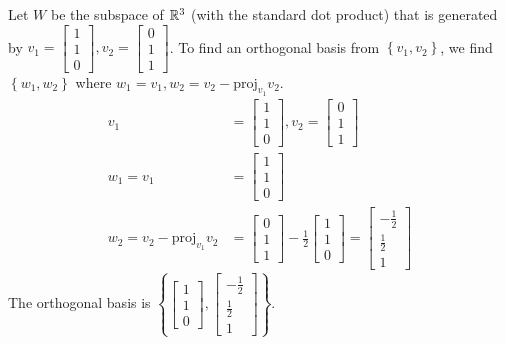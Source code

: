 \documentclass{article}
\begin{document}
\problem
{}
Let $W$ be the subspace of $\mathbb{R}^3$ (with the standard dot product) that is generated by $v_1 = \begin{bmatrix} 1 \\ 1 \\ 0 \end{bmatrix}, v_2 = \begin{bmatrix} 0 \\ 1 \\ 1 \end{bmatrix}$. To find an orthogonal basis from $\left\{v_1, v_2\right\}$, we find $\left\{w_1, w_2 \right\}$ where $w_1 = v_1, w_2 = v_2 - \mathrm{proj}_{v_1} v_2$.
\begin{equation}
    \begin{split}
        v_1 & = \begin{bmatrix}1 \\ 1 \\ 0\end{bmatrix}, v_2 = \begin{bmatrix}0 \\ 1 \\ 1\end{bmatrix} \\
        w_1 = v_1 & = \begin{bmatrix}1 \\ 1 \\ 0\end{bmatrix} \\
        w_2 = v_2 - \mathrm{proj}_{v_1} v_2 & = \begin{bmatrix}0 \\ 1 \\ 1\end{bmatrix} - \frac{1}{2}\begin{bmatrix}1 \\ 1 \\ 0\end{bmatrix} = \begin{bmatrix}-\frac{1}{2} \\ \frac{1}{2} \\ 1\end{bmatrix}
    \end{split}
\end{equation}
The orthogonal basis is $\left\{\begin{bmatrix}1 \\ 1 \\ 0\end{bmatrix}, \begin{bmatrix}-\frac{1}{2} \\ \frac{1}{2} \\ 1\end{bmatrix}\right\}$.
\end{document}
